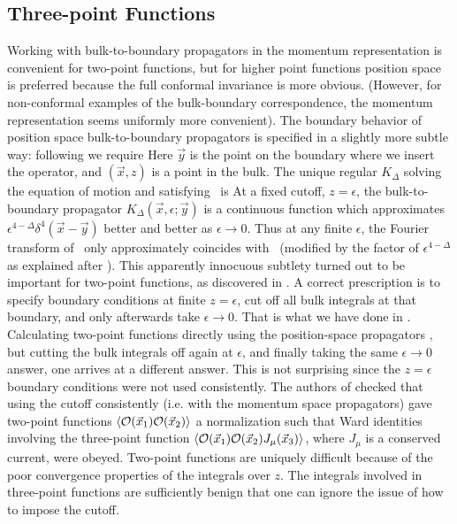 \subsection{Three-point Functions}
\label{ThreePoint}

Working with bulk-to-boundary propagators in the momentum representation is
convenient for two-point functions, but for higher point functions position
space is preferred because the full conformal invariance is more obvious.
(However, for non-conformal examples of the bulk-boundary correspondence,
the momentum representation seems uniformly more convenient).  The boundary
behavior of position space bulk-to-boundary propagators is specified in a
slightly more subtle way: following \cite{Freedman:1998tz} we require
 Here $\vec{y}$ is the point on the boundary where we insert the
operator, and $(\vec{x},z)$ is a point
in the bulk.  The unique regular $K_\Delta$ solving the equation of
motion and satisfying \BBPlimit\ is 
 At a fixed cutoff, $z=\epsilon$, the bulk-to-boundary propagator
$K_\Delta(\vec{x},\epsilon;\vec{y})$ is a
continuous function which approximates $\epsilon^{4-\Delta}
\delta^4(\vec{x}-\vec{y})$ better and
better as $\epsilon\to 0$.  Thus at any finite $\epsilon$, the Fourier
transform of \BBPvalue\ only approximately coincides with \BoundaryProp\
(modified by the factor of $\epsilon^{4-\Delta}$ as explained after
\TwoPtFct).  This apparently innocuous subtlety turned out to be important
for two-point functions, as discovered in \cite{Freedman:1998tz}.  A correct
prescription is to specify boundary conditions at finite $z = \epsilon$,
cut off all bulk integrals at that boundary, and only afterwards take
$\epsilon\to 0$.  That is what we have done in \TwoPtFct.  Calculating
two-point functions directly using the position-space propagators
\BBPlimit, but cutting the bulk integrals off again at $\epsilon$, and
finally taking the same $\epsilon\to 0$ answer, one arrives at a different
answer.  This is not surprising since the $z = \epsilon$ boundary
conditions were not used consistently.  
The authors of \cite{Freedman:1998tz} checked
that using the cutoff consistently (i.e. with the momentum space propagators)
gave two-point functions $\langle {\cal O}(\vec{x}_1) {\cal O}(\vec{x}_2)
\rangle$ a normalization such that Ward identities involving the
three-point function $\langle {\cal O}(\vec{x}_1) {\cal O}(\vec{x}_2)
J_\mu(\vec{x}_3) \rangle$, where $J_\mu$ is a conserved current, were
obeyed.  Two-point functions are uniquely difficult because of the poor
convergence properties of the integrals over $z$.  The integrals involved
in three-point functions are sufficiently benign that one can ignore the
issue of how to impose the cutoff.

